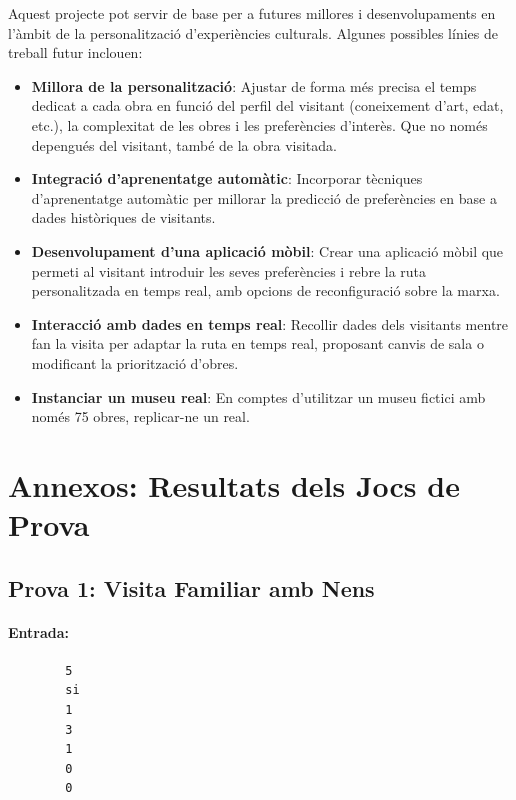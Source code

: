 \documentclass[a4paper]{article}
\begin{document}
	Aquest projecte pot servir de base per a futures millores i desenvolupaments en l'àmbit de la personalització d'experiències culturals. Algunes possibles línies de treball futur inclouen:
	
	\begin{itemize}
		\item \textbf{Millora de la personalització}: Ajustar de forma més precisa el temps dedicat a cada obra en funció del perfil del visitant (coneixement d'art, edat, etc.), la complexitat de les obres i les preferències d'interès. Que no només depengués del visitant, també de la obra visitada.
		\item \textbf{Integració d'aprenentatge automàtic}: Incorporar tècniques d'aprenentatge automàtic per millorar la predicció de preferències en base a dades històriques de visitants.
		\item \textbf{Desenvolupament d'una aplicació mòbil}: Crear una aplicació mòbil que permeti al visitant introduir les seves preferències i rebre la ruta personalitzada en temps real, amb opcions de reconfiguració sobre la marxa.
		\item \textbf{Interacció amb dades en temps real}: Recollir dades dels visitants mentre fan la visita per adaptar la ruta en temps real, proposant canvis de sala o modificant la priorització d'obres.
		\item \textbf{Instanciar un museu real}: En comptes d'utilitzar un museu fictici amb només 75 obres, replicar-ne un real.
	\end{itemize}
	
	\newpage
	\section{Annexos: Resultats dels Jocs de Prova}
	\label{sec:annex}
	\subsection{Prova 1: Visita Familiar amb Nens}
	\paragraph{Entrada:}
	
	\begin{verbatim}
		5
		si
		1
		3
		1
		0
		0
	\end{verbatim}
	
\end{document}
